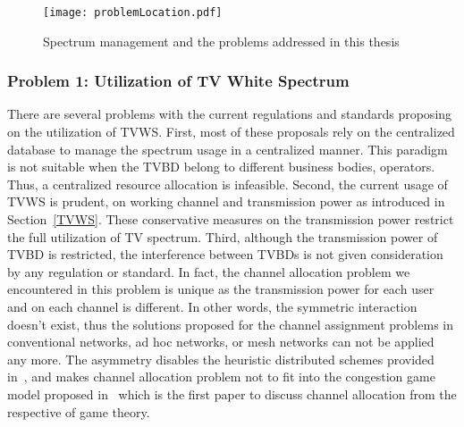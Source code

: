 \begin{figure}[h!]
  \centering
  \texttt{[image: problemLocation.pdf]}
  \caption{Spectrum management and the problems addressed in this thesis}
\label{problemLocation}
\end{figure}

\subsubsection{Problem 1: Utilization of TV White Spectrum}



There are several problems with the current regulations and standards proposing on the utilization of TVWS.
First, most of these proposals rely on the centralized database to manage the spectrum usage in a centralized manner.
This paradigm is not suitable when the TVBD belong to different business bodies, \ie operators.
Thus, a centralized resource allocation is infeasible.
Second, the current usage of TVWS is prudent, \ie on working channel and transmission power as introduced in Section~\ref{TVWS}.
These conservative measures on the transmission power restrict the full utilization of TV spectrum.
Third, although the transmission power of TVBD is restricted, the interference between TVBDs is not given consideration by any regulation or standard.
In fact, the channel allocation problem we encountered in this problem is unique as the transmission power for each user and on each channel is different.
In other words, the symmetric interaction doesn't exist, thus the solutions proposed for the channel assignment problems in conventional networks, \eg ad hoc networks, or mesh networks can not be applied any more.
The asymmetry disables the heuristic distributed schemes provided in~\cite{Ko_DistributedCA}, and makes channel allocation problem not to fit into the congestion game model proposed in~\cite{allerton08_liu} which is the first paper to discuss channel allocation from the respective of game theory.


